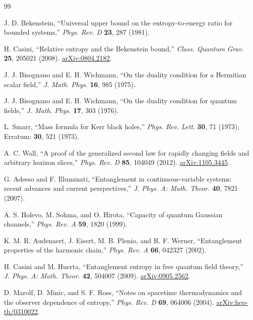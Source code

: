 \documentclass[11pt]{article}
\begin{document}
\begin{thebibliography}{99}

J. D. Bekenstein, ``Universal upper bound on the entropy-to-energy ratio for bounded systems,''
\textit{Phys. Rev. D} \textbf{23}, 287 (1981).

H. Casini, ``Relative entropy and the Bekenstein bound,''
\textit{Class. Quantum Grav.} \textbf{25}, 205021 (2008).
\href{https://arxiv.org/abs/0804.2182}{arXiv:0804.2182}.

J. J. Bisognano and E. H. Wichmann, ``On the duality condition for a Hermitian scalar field,''
\textit{J. Math. Phys.} \textbf{16}, 985 (1975).

J. J. Bisognano and E. H. Wichmann, ``On the duality condition for quantum fields,''
\textit{J. Math. Phys.} \textbf{17}, 303 (1976).

L. Smarr, ``Mass formula for Kerr black holes,''
\textit{Phys. Rev. Lett.} \textbf{30}, 71 (1973); Erratum: \textbf{30}, 521 (1973).

A. C. Wall, ``A proof of the generalized second law for rapidly changing fields and arbitrary horizon slices,''
\textit{Phys. Rev. D} \textbf{85}, 104049 (2012).
\href{https://arxiv.org/abs/1105.3445}{arXiv:1105.3445}.

G. Adesso and F. Illuminati, ``Entanglement in continuous-variable systems: recent advances and current perspectives,''
\textit{J. Phys. A: Math. Theor.} \textbf{40}, 7821 (2007).

A. S. Holevo, M. Sohma, and O. Hirota, ``Capacity of quantum Gaussian channels,''
\textit{Phys. Rev. A} \textbf{59}, 1820 (1999).

K. M. R. Audenaert, J. Eisert, M. B. Plenio, and R. F. Werner, ``Entanglement properties of the harmonic chain,''
\textit{Phys. Rev. A} \textbf{66}, 042327 (2002).

H. Casini and M. Huerta, ``Entanglement entropy in free quantum field theory,''
\textit{J. Phys. A: Math. Theor.} \textbf{42}, 504007 (2009).
\href{https://arxiv.org/abs/0905.2562}{arXiv:0905.2562}.

D. Marolf, D. Minic, and S. F. Ross, ``Notes on spacetime thermodynamics and the observer dependence of entropy,''
\textit{Phys. Rev. D} \textbf{69}, 064006 (2004).
\href{https://arxiv.org/abs/hep-th/0310022}{arXiv:hep-th/0310022}.


\end{thebibliography}
\end{document}

